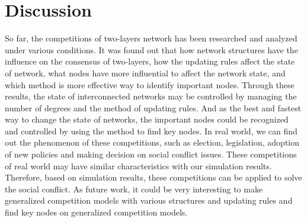   
\section{Discussion} 
So far, the competitions of two-layers network has been researched and analyzed under various conditions. It was found out that how network structures have the influence on the consensus of two-layers, how the updating rules affect the state of network, what nodes have more influential to affect the network state, and which method is more effective way to identify important nodes. Through these results, the state of interconnected networks may be controlled by managing the number of degrees and the method of updating rules. And as the best and fastest way to change the state of networks, the important nodes could be recognized and controlled by using the method to find key nodes.
In real world, we can find out the phenomenon of these competitions, such as election, legislation, adoption of new policies and making decision on social conflict issues. These competitions of real world may have similar characteristics with our simulation results. Therefore, based on simulation results, these competitions can be applied to solve the social conflict. As future work, it could be very interesting to make generalized competition models with various structures and updating rules and find key nodes on generalized competition models.   
